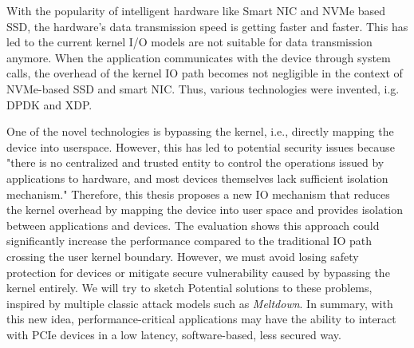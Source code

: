 




With the popularity of intelligent hardware like 
Smart NIC and NVMe based SSD\cite{10.1145/2757667.2757684}, the hardware's data transmission 
speed is getting faster and faster. This has led to the current kernel
I/O models are not suitable for data 
transmission anymore. When the application communicates
 with the device through system calls, the overhead of the kernel IO path 
 becomes not negligible in the context of NVMe-based SSD and smart NIC\cite{12}. 
 Thus, various technologies were invented, i.g. DPDK\cite{7} and XDP\cite{10.1145/3281411.3281443}.

 One of the novel technologies is bypassing the kernel, i.e., directly mapping the device into userspace. However, 
this has led to potential security issues because "there is 
no centralized and trusted entity to control the operations 
issued by applications to hardware, and most devices
themselves lack sufficient isolation mechanism." Therefore, this thesis proposes a new 
IO mechanism that reduces the kernel overhead by mapping the device into user space 
and provides isolation between applications and devices. 
 The evaluation shows this approach could significantly increase the performance 
 compared to the traditional IO path crossing the user kernel boundary. However, 
 we must avoid losing safety protection for devices or mitigate secure vulnerability 
 caused by bypassing the kernel entirely. We will try to
sketch Potential solutions to these problems, inspired by multiple 
classic attack models such as \emph{Meltdown}\cite{1}. In summary, with this new idea, 
performance-critical applications may have the ability to interact with 
PCIe devices in a low latency, software-based, less secured way.


